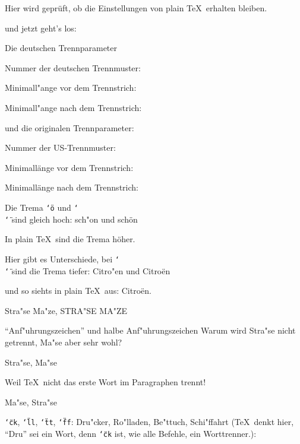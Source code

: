 \parindent=0pt
\overfullrule=0pt
Hier wird gepr\"uft, ob die Einstellungen von plain \TeX\ erhalten bleiben.
\ifnum{}\else{}\fi
\ifnum{}\else{}\fi
\ifnum{}\else{}\fi
\par und jetzt geht's los:


\def\qq#1{"`{\tt\char`\" #1}"'}

\def\qq#1{{\tt\char`\" #1}}
\def\bs#1{{\tt\char`\\ #1}}

\par Die deutschen Trennparameter 
\par Nummer der deutschen Trennmuster: \the\language
\par Minimall"ange vor dem Trennstrich: \the\lefthyphenmin
\par Minimall"ange nach dem Trennstrich: \the\righthyphenmin
\originalTeX
\par und die originalen Trennparameter:
\par Nummer der US-Trennmuster: \the\language
\par Minimall\"ange vor dem Trennstrich: \the\lefthyphenmin
\par Minimall\"ange nach dem Trennstrich: \the\righthyphenmin
\germanTeX
\par Die Trema \qq o und \bs {\char`\"} sind gleich hoch: sch"on und sch\"on
\originalTeX
\par In plain \TeX\ sind die Trema h\"oher.
\germanTeX
\par Hier gibt es Unterschiede, bei \bs {\char`\"} sind die Trema tiefer:
Citro"en und Citro\"en
\originalTeX
\par und so siehts in plain \TeX\ aus: Citro\"en.
\germanTeX
\par Stra"se Ma"ze,
STRA"SE MA"ZE
\par "`Anf"uhrungszeichen"' und \glq halbe Anf"uhrungszeichen\grq
\vskip 1cm
Warum wird Stra"se nicht getrennt, Ma"se aber sehr wohl?

\centerline{\vbox {\hsize 1pt Stra"se, Ma"se}}

Weil \TeX\ nicht das erste Wort im Paragraphen trennt!

\centerline{\vbox {\hsize 1pt Ma"se, Stra"se}}
\vskip 1cm
\par\qq{ck}, \qq{ll}, \qq{tt}, \qq{ff}: Dru"cker, Ro"lladen, Be"ttuch,
Schi"ffahrt (\TeX\ denkt hier, "`Dru"' sei ein Wort,
denn \qq{ck} ist, wie alle Befehle, ein Worttrenner.):

